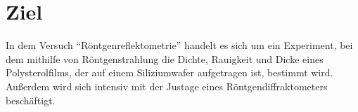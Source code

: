 \section{Ziel}
\label{sec:Ziel}

In dem Versuch \enquote{Röntgenreflektometrie} handelt es sich um ein Experiment, bei dem mithilfe von Röntgenstrahlung die Dichte, Rauigkeit und Dicke eines
Polysterolfilms, der auf einem Siliziumwafer aufgetragen ist, bestimmt wird.
Außerdem wird sich intensiv mit der Justage eines Röntgendiffraktometers beschäftigt.